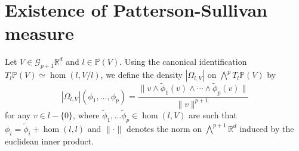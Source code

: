 \documentclass{report}
\begin{document}
\section{Existence of Patterson-Sullivan measure}\label{sec:MeasureExistence}
\begin{definition}
    Let $V \in \mathcal G_{p+1}{\mathbb R^d}$ and $l \in \mathbb P(V)$.
    Using the canonical identification $T_l \mathbb P(V) \simeq \hom (l, V/l)$, we define the density $|\Omega_{l, V}|$ on $\bigwedge^p T_l \mathbb P(V)$ by
    \[
        |\Omega_{l,V}|(\phi_1, \ldots, \phi_p) = 
        \frac{\| v \wedge \tilde \phi_1(v) \wedge \cdots \wedge \tilde \phi_p (v) \|}{\|v\|^{p+1}}
    \]
    for any $v \in l - \{ 0\}$, where $\tilde \phi_1, \ldots \tilde \phi_p \in \hom(l, V)$ are such that $\phi_i = \tilde \phi_i + \hom(l, l)$ and $\| \cdot \|$ denotes the norm on $\bigwedge^{p+1} \mathbb R^d$ induced by the euclidean inner product.
\end{definition}
\end{document}
